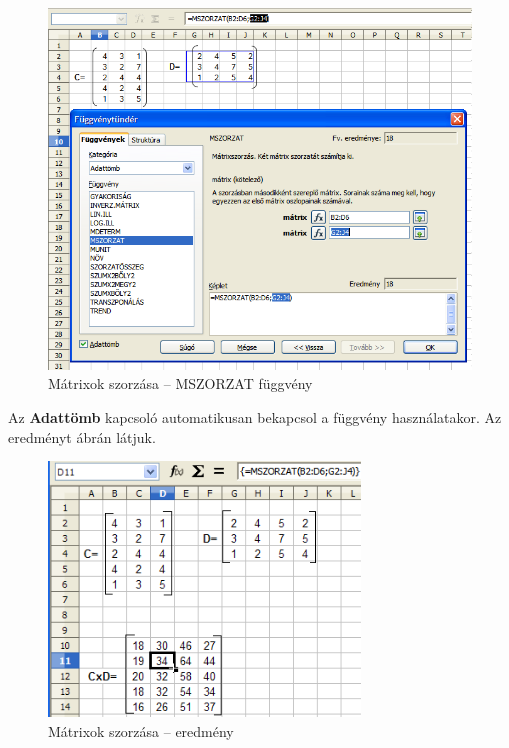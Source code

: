 \begin{figure}[!h]
\begin{center}
\includegraphics[width=13.999cm]{oocalcv2-img133.png}
\caption{Mátrixok szorzása -- MSZORZAT függvény}\label{MátrixokSzorzásaMMULT}
\end{center}
\end{figure}

Az \textbf{Adattömb} kapcsoló automatikusan bekapcsol a függvény
használatakor. Az eredményt  ábrán látjuk.

\begin{figure}[!h]
\begin{center}
\includegraphics[width=8.285cm]{oocalcv2-img134.png}
\caption{Mátrixok szorzása -- eredmény}\label{MátrixokSzorzásaEredmény}
\end{center}
\end{figure}


